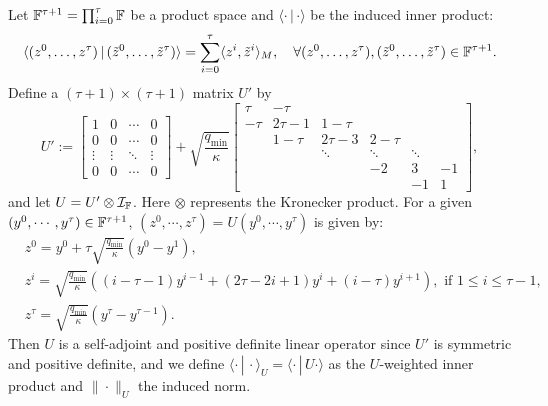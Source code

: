{Let $\mathbb{F}^{\tau+1}=\prod_{i=0}^{\tau}\mathbb{F}$ be a product space and $\langle\cdot\, |\,\cdot \rangle$ be the induced  inner product:
$$\langle (z^0,\ldots,z^{\tau})\,|\,(\tilde{z}^0,\ldots,\tilde{z}^{\tau})\rangle=\sum_{i=0}^{\tau}\langle z^i,\tilde{z}^i\rangle_M,\quad\forall (z^0,\ldots,z^{\tau}), (\tilde{z}^0,\ldots,\tilde{z}^{\tau})\in\mathbb{F}^{\tau+1}.$$ 
Define a $(\tau+1)\times(\tau+1)$ matrix $U'$ by 
\begin{equation*}%
U':=\begin{bmatrix}1 & 0 & \cdots &0\\
0 & 0 &\cdots & 0\\ \vdots &\vdots & \ddots & \vdots\\
0 & 0 &\cdots & 0 \end{bmatrix}
+\sqrt{\frac{q_{\min}}{\kappa}}\begin{bmatrix} \tau & -\tau &  & \\
-\tau & 2\tau-1 & 1-\tau & \\
 & 1-\tau & 2\tau-3 & 2-\tau  & \\
 & & \ddots & \ddots & \ddots &\\
 & & & -2 & 3  & -1 \\
 & & & &-1 & 1
\end{bmatrix},
\end{equation*}
and let $U=U'\otimes {\mathcal{I}}_{\mathbb{F}}$. Here $\otimes$ represents the Kronecker product. For a given $(y^0,\cdots,y^\tau)\in\mathbb{F}^{\tau+1}$, $(z^0,\cdots,z^\tau)=U(y^0,\cdots,y^\tau)$ is given by:
\begin{align*}
&z^0=\textstyle
y^0+\tau\sqrt{\frac{q_{\min}}{\kappa}} (y^0-y^1),\\
&z^i =
\textstyle\sqrt{\frac{q_{\min}}{\kappa}}((i-\tau-1)y^{i-1}+(2\tau-2i+1)y^i+(i-\tau)y^{i+1}),\text{ if } 1\le i\le \tau-1,\\
&z^{\tau}=\textstyle\sqrt{\frac{q_{\min}}{\kappa}} (y^{\tau}-y^{\tau-1}).
\end{align*} 
Then $U$ is a self-adjoint and positive definite linear operator since $U'$ is
symmetric and positive definite, and we define $\langle\cdot\, |\,
\cdot\rangle_U=\langle\cdot\, |\, U\cdot\rangle$ as the $U$-weighted inner
product and $\|\cdot\|_U$ the induced norm.
 
}
